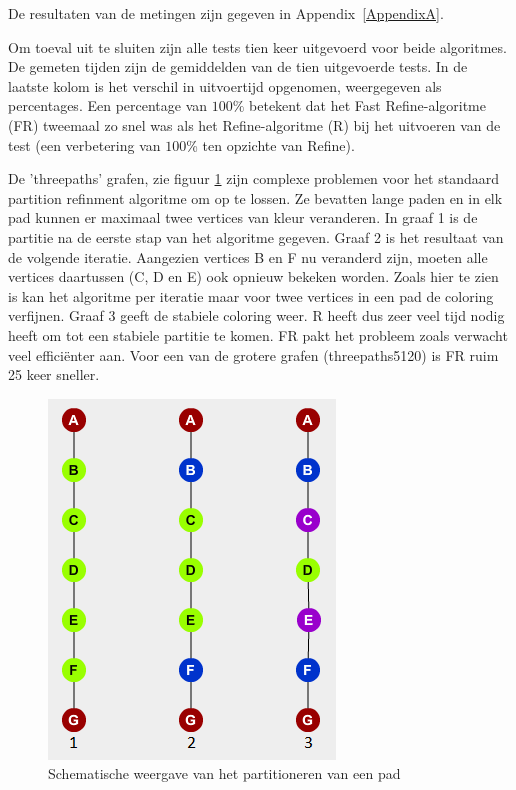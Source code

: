 \documentclass[twoside]{article}
\begin{document}
\begin{multicols}{2}
De resultaten van de metingen zijn gegeven in Appendix~\ref{AppendixA}.

Om toeval uit te sluiten zijn alle tests tien keer uitgevoerd voor beide algoritmes. De gemeten tijden zijn de gemiddelden van de tien uitgevoerde tests. In de laatste kolom is het verschil in uitvoertijd opgenomen, weergegeven als percentages. Een percentage van $100\%$ betekent dat het Fast Refine-algoritme (FR) tweemaal zo snel was als het Refine-algoritme (R) bij het uitvoeren van de test (een verbetering van $100$\% ten opzichte van Refine).

De 'threepaths' grafen, zie figuur \ref{paths} zijn complexe problemen voor het standaard partition refinment algoritme om op te lossen. Ze bevatten lange paden en in elk pad kunnen er maximaal twee vertices van kleur veranderen. In graaf 1 is de partitie na de eerste stap van het algoritme gegeven. Graaf 2 is het resultaat van de volgende iteratie. Aangezien vertices B en F nu veranderd zijn, moeten alle vertices daartussen (C, D en E) ook opnieuw bekeken worden. Zoals hier te zien is kan het algoritme per iteratie maar voor twee vertices in een pad de coloring verfijnen. Graaf 3 geeft de stabiele coloring weer. R heeft dus zeer veel tijd nodig heeft om tot een stabiele partitie te komen. FR pakt het probleem zoals verwacht veel effici\"enter aan. Voor een van de grotere grafen (threepaths5120) is FR ruim 25 keer sneller.

\begin{figure}[H]
\centering
\includegraphics[]{paths.png}
\caption{Schematische weergave van het partitioneren van een pad}
\label{paths}
\end{figure}



\end{multicols}
\end{document}

